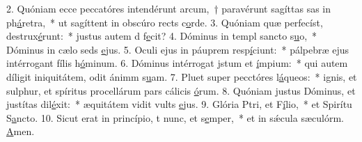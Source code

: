 2. Quóniam ecce peccatóres intendérunt arcum,~† paravérunt sagíttas sas in ph\uline{á}retra,~* ut sagíttent in obscúro rects c\uline{o}rde.
3. Quóniam quæ perfecíst, destrux\uline{é}runt:~* justus autem d f\uline{e}cit?
4. Dóminus in templ sancto s\uline{u}o,~* Dóminus in cælo seds \uline{e}jus.
5. Oculi ejus in páuprem resp\uline{í}ciunt:~* pálpebræ ejus intérrogant fílis h\uline{ó}minum.
6. Dóminus intérrogat jstum et \uline{í}mpium:~* qui autem díligit iniquitátem, odit ánimm s\uline{u}am.
7. Pluet super pecctóres l\uline{á}queos:~* ignis, et sulphur, et spíritus procellárum pars cálicis \uline{ó}rum.
8. Quóniam justus Dóminus, et justítas dil\uline{é}xit:~* æquitátem vidit vults \uline{e}jus.
9. Glória Ptri, et F\uline{í}lio,~* et Spirítu S\uline{a}ncto.
10. Sicut erat in princípio, t nunc, et s\uline{e}mper,~* et in sǽcula sæculórm. \uline{A}men.

